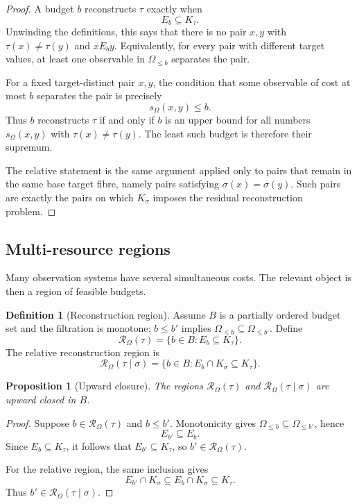 \documentclass[11pt]{article}
\newtheorem{proposition}[theorem]{Proposition}
\theoremstyle{definition}
\newtheorem{definition}[theorem]{Definition}
\theoremstyle{remark}
\begin{document}
\begin{proof}
A budget \(b\) reconstructs \(\tau\) exactly when
\[
E_b\subseteq K_\tau.
\]
Unwinding the definitions, this says that there is no pair \(x,y\) with \(\tau(x)\neq\tau(y)\) and \(xE_by\).  Equivalently, for every pair with different target values, at least one observable in \(\Omega_{\le b}\) separates the pair.

For a fixed target-distinct pair \(x,y\), the condition that some observable of cost at most \(b\) separates the pair is precisely
\[
s_\Omega(x,y)\leq b.
\]
Thus \(b\) reconstructs \(\tau\) if and only if \(b\) is an upper bound for all numbers \(s_\Omega(x,y)\) with \(\tau(x)\neq\tau(y)\).  The least such budget is therefore their supremum.

The relative statement is the same argument applied only to pairs that remain in the same base target fibre, namely pairs satisfying \(\sigma(x)=\sigma(y)\).  Such pairs are exactly the pairs on which \(K_\sigma\) imposes the residual reconstruction problem.
\end{proof}

\subsection{Multi-resource regions}

Many observation systems have several simultaneous costs.  The relevant object is then a region of feasible budgets.

\begin{definition}[Reconstruction region]
Assume \(B\) is a partially ordered budget set and the filtration is monotone: \(b\leq b'\) implies \(\Omega_{\le b}\subseteq\Omega_{\le b'}\).  Define
\[
\mathcal R_\Omega(\tau)
=
\{b\in B:E_b\subseteq K_\tau\}.
\]
The relative reconstruction region is
\[
\mathcal R_\Omega(\tau\mid\sigma)
=
\{b\in B:E_b\cap K_\sigma\subseteq K_\tau\}.
\]
\end{definition}

\begin{proposition}[Upward closure]
The regions \(\mathcal R_\Omega(\tau)\) and \(\mathcal R_\Omega(\tau\mid\sigma)\) are upward closed in \(B\).
\end{proposition}

\begin{proof}
Suppose \(b\in\mathcal R_\Omega(\tau)\) and \(b\leq b'\).  Monotonicity gives \(\Omega_{\le b}\subseteq\Omega_{\le b'}\), hence
\[
E_{b'}\subseteq E_b.
\]
Since \(E_b\subseteq K_\tau\), it follows that \(E_{b'}\subseteq K_\tau\), so \(b'\in\mathcal R_\Omega(\tau)\).

For the relative region, the same inclusion gives
\[
E_{b'}\cap K_\sigma\subseteq E_b\cap K_\sigma\subseteq K_\tau.
\]
Thus \(b'\in\mathcal R_\Omega(\tau\mid\sigma)\).
\end{proof}
\end{document}
